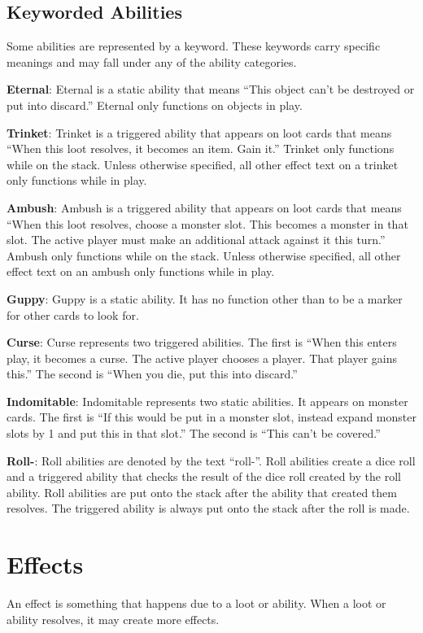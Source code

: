 \documentclass[10pt, a4paper, twoside]{article} %
\begin{document}
    \subsection{Keyworded Abilities}
    \label{keyworded}
    Some abilities are represented by a keyword. These keywords carry specific meanings and may fall under any of the ability categories.

    \textbf{Eternal}: Eternal is a static ability that means “This object can’t be destroyed or put into discard.” Eternal only functions on objects in play.
    
    \textbf{Trinket}: Trinket is a triggered ability that appears on loot cards that means “When this loot resolves, it becomes an item. Gain it.” Trinket only functions while on the stack. Unless otherwise specified, all other effect text on a trinket only functions while in play.
    
    \textbf{Ambush}: Ambush is a triggered ability that appears on loot cards that means “When this loot resolves, choose a monster slot. This becomes a monster in that slot. The active player must make an additional attack against it this turn.” Ambush only functions while on the stack. Unless otherwise specified, all other effect text on an ambush only functions while in play.
    
    \textbf{Guppy}: Guppy is a static ability. It has no function other than to be a marker for other cards to look for.
    
    \textbf{Curse}: Curse represents two triggered abilities. The first is “When this enters play, it becomes a curse. The active player chooses a player. That player gains this.” The second is “When you die, put this into discard.”
    
    \textbf{Indomitable}: Indomitable represents two static abilities. It appears on monster cards. The first is “If this would be put in a monster slot, instead expand monster slots by 1 and put this in that slot.” The second is “This can’t be covered.”
    
    \textbf{Roll-}: Roll abilities are denoted by the text “roll-”. Roll abilities create a dice roll and a triggered ability that checks the result of the dice roll created by the roll ability. Roll abilities are put onto the stack after the ability that created them resolves. The triggered ability is always put onto the stack after the roll is made.

    \section{Effects}
    \label{effects}
    An effect is something that happens due to a loot or ability. When a loot or ability resolves, it may create more effects.
    
\end{document}

